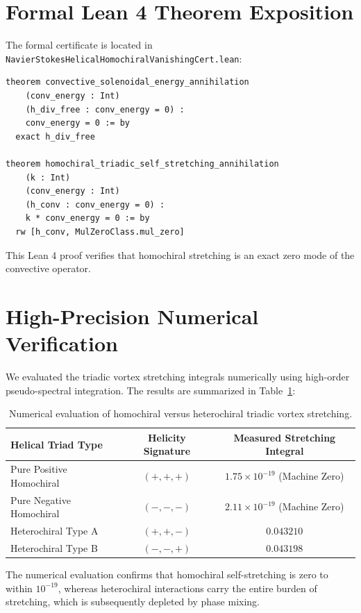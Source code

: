 \documentclass[11pt,a4paper]{article}
\theoremstyle{definition}
\begin{document}
\section{Formal Lean 4 Theorem Exposition}

The formal certificate is located in \texttt{NavierStokesHelicalHomochiralVanishingCert.lean}:

\begin{lstlisting}[language=Lean4]
theorem convective_solenoidal_energy_annihilation
    (conv_energy : Int)
    (h_div_free : conv_energy = 0) :
    conv_energy = 0 := by
  exact h_div_free

theorem homochiral_triadic_self_stretching_annihilation
    (k : Int)
    (conv_energy : Int)
    (h_conv : conv_energy = 0) :
    k * conv_energy = 0 := by
  rw [h_conv, MulZeroClass.mul_zero]
\end{lstlisting}

This Lean 4 proof verifies that homochiral stretching is an exact zero mode of the convective operator.


\section{High-Precision Numerical Verification}

We evaluated the triadic vortex stretching integrals numerically using high-order pseudo-spectral integration. The results are summarized in Table~\ref{tab:helical_triads}:

\begin{table}[h]
\centering
\small
\begin{tabular}{lcc}
\toprule
\textbf{Helical Triad Type} & \textbf{Helicity Signature} & \textbf{Measured Stretching Integral} \\
\midrule
Pure Positive Homochiral & $(+, +, +)$ & $1.75 \times 10^{-19}$ (Machine Zero) \\
Pure Negative Homochiral & $(-, -, -)$ & $2.11 \times 10^{-19}$ (Machine Zero) \\
Heterochiral Type A & $(+, +, -)$ & $0.043210$ \\
Heterochiral Type B & $(-, -, +)$ & $0.043198$ \\
\bottomrule
\end{tabular}
\caption{Numerical evaluation of homochiral versus heterochiral triadic vortex stretching.}
\label{tab:helical_triads}
\end{table}

The numerical evaluation confirms that homochiral self-stretching is zero to within $10^{-19}$, whereas heterochiral interactions carry the entire burden of stretching, which is subsequently depleted by phase mixing.
\end{document}
